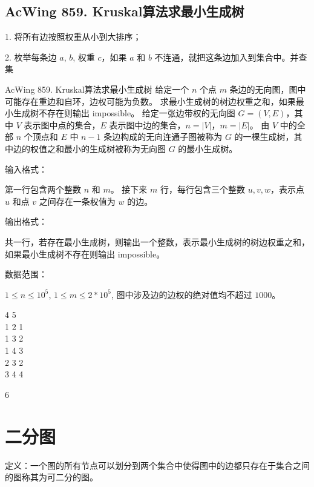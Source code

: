 \subsection{AcWing 859. Kruskal算法求最小生成树}

1. 将所有边按照权重从小到大排序；

2. 枚举每条边 $a$, $b$, 权重 $c$，如果 $a$ 和 $b$ 不连通，就把这条边加入到集合中。并查集


\begin{titledbox}{AcWing 859. Kruskal算法求最小生成树}
    给定一个 $n$ 个点 $m$ 条边的无向图，图中可能存在重边和自环，边权可能为负数。 求最小生成树的树边权重之和，如果最小生成树不存在则输出 impossible。 给定一张边带权的无向图 $G=(V, E)$，其中 $V$ 表示图中点的集合，$E$ 表示图中边的集合，$n=|V|$，$m=|E|$。 由 $V$ 中的全部 $n$ 个顶点和 $E$ 中 $n-1$ 条边构成的无向连通子图被称为 $G$ 的一棵生成树，其中边的权值之和最小的生成树被称为无向图 $G$ 的最小生成树。

    输入格式：

    第一行包含两个整数 $n$ 和 $m$。 接下来 $m$ 行，每行包含三个整数 $u,v,w$，表示点 $u$ 和点 $v$ 之间存在一条权值为 $w$ 的边。

    输出格式：

    共一行，若存在最小生成树，则输出一个整数，表示最小生成树的树边权重之和，如果最小生成树不存在则输出 impossible。

    数据范围：

    $1 \le n \le 10^5$, $1 \le m \le 2*10^5$, 图中涉及边的边权的绝对值均不超过 $1000$。

    \begin{inputblock}
        4 5 \\
        1 2 1 \\
        1 3 2 \\
        1 4 3 \\
        2 3 2 \\
        3 4 4
    \end{inputblock}
    \begin{outputblock}
        6
    \end{outputblock}
\end{titledbox}


\section{二分图}

定义：一个图的所有节点可以划分到两个集合中使得图中的边都只存在于集合之间的图称其为可二分的图。

